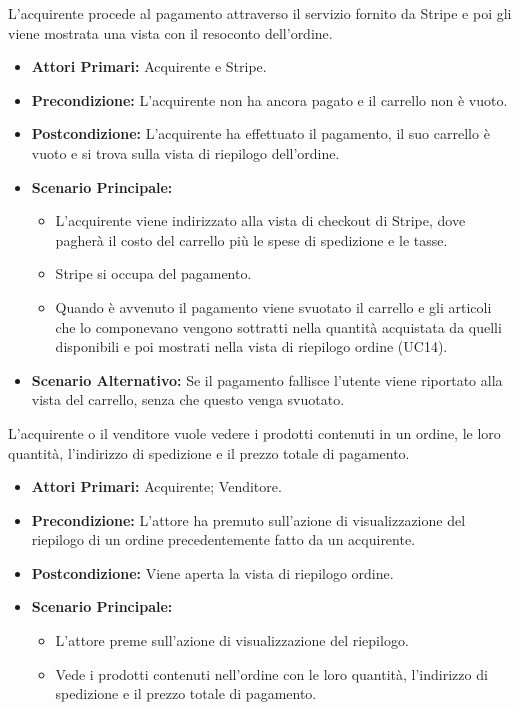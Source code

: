 L'acquirente procede al pagamento attraverso il servizio fornito da Stripe e poi gli viene mostrata una vista con il resoconto dell'ordine.
\begin{itemize}
    \item \textbf{Attori Primari:} Acquirente e Stripe.
    \item \textbf{Precondizione:} L'acquirente non ha ancora pagato e il carrello non è vuoto.
    \item \textbf{Postcondizione:} L'acquirente ha effettuato il pagamento, il suo carrello è vuoto e si trova sulla vista di riepilogo dell'ordine.
    \item \textbf{Scenario Principale:}
        \begin{itemize}
            \item L'acquirente viene indirizzato alla vista di checkout di Stripe, dove pagherà il costo del carrello più le spese di spedizione e le tasse.
            \item Stripe si occupa del pagamento.
            \item Quando è avvenuto il pagamento viene svuotato il carrello e gli articoli che lo componevano vengono sottratti nella quantità acquistata da quelli disponibili e poi mostrati nella vista di riepilogo ordine (UC14).
        \end{itemize}
    \item \textbf{Scenario Alternativo:} Se il pagamento fallisce l'utente viene riportato alla vista del carrello, senza che questo venga svuotato.
\end{itemize}

L'acquirente o il venditore vuole vedere i prodotti contenuti in un ordine, le loro quantità, l'indirizzo di spedizione e il prezzo totale di pagamento.
\begin{itemize}
    \item \textbf{Attori Primari:} Acquirente; Venditore.
    \item \textbf{Precondizione:} L'attore ha premuto sull'azione di visualizzazione del riepilogo di un ordine precedentemente fatto da un acquirente. 
    \item \textbf{Postcondizione:} Viene aperta la vista di riepilogo ordine.
    \item \textbf{Scenario Principale:}
    \begin{itemize}
        \item L'attore preme sull'azione di visualizzazione del riepilogo.
        \item Vede i prodotti contenuti nell'ordine con le loro quantità, l'indirizzo di spedizione e il prezzo totale di pagamento.
    \end{itemize}
\end{itemize}
